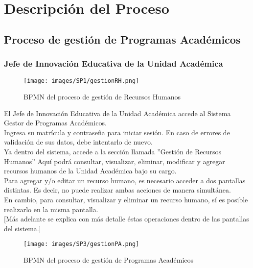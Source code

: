 \chapter{Descripción del Proceso}
    \section{Proceso de gestión de Programas Académicos}
        \subsection{Jefe de Innovación Educativa de la Unidad Académica}
        
        \begin{figure}[!hbtp]
        	\centering
        	\hypertarget{bpmn}{\texttt{[image: images/SP1/gestionRH.png]}}
        	\caption{BPMN del proceso de gestión de Recursos Humanos}
        	\label{editarrh}
        \end{figure}
        
        El Jefe de Innovación Educativa de la Unidad Académica accede al Sistema Gestor de Programas Académicos.\\
        
        Ingresa su matrícula y contraseña para iniciar sesión. En caso de errores de validación de sus datos, debe intentarlo de nuevo.\\
        
        Ya dentro del sistema, accede a la sección llamada ''Gestión de Recursos Humanos'' Aquí podrá consultar, visualizar, eliminar, modificar y agregar recursos humanos de la Unidad Académica bajo su cargo. \\
        
        Para agregar y/o editar un recurso humano, es necesario acceder a dos pantallas distintas. Es decir, no puede realizar ambas acciones de manera simultánea.\\
        
        En cambio, para consultar, visualizar y eliminar un recurso humano, sí es posible realizarlo en la misma pantalla.\\
        
        [Más adelante se explica con más detalle éstas operaciones dentro de las pantallas del sistema.]\\
        
        \begin{figure}[!hbtp]
        	\centering
        	\hypertarget{bpmn2}{\texttt{[image: images/SP3/gestionPA.png]}}
        	\caption{BPMN del proceso de gestión de Programas Académicos}
        	\label{bmpn2}
        \end{figure}
        
